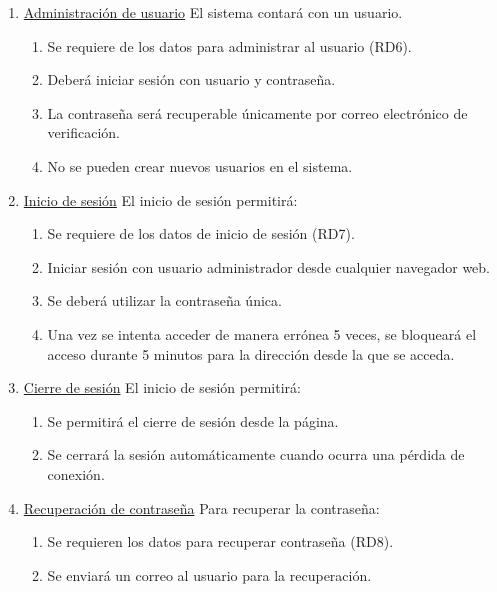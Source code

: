 \documentclass[10pt,a4paper]{article}
\begin{document}
\begin{enumerate}[label=RF\arabic*. ,leftmargin=2.8\parindent]
	\bigskip
	\item \underline{Administración de usuario}
	\newline \newline
	El sistema contará con un usuario.
	\begin{enumerate}[label=-]
	\item Se requiere de los datos para administrar al usuario (RD6).
		\item Deberá iniciar sesión con usuario y contraseña.
		\item La contraseña será recuperable únicamente por correo electrónico de verificación.
		\item No se pueden crear nuevos usuarios en el sistema.
		
	\end{enumerate}

	\bigskip
	\item \underline{Inicio de sesión}
	\newline \newline
	El inicio de sesión permitirá:
	\begin{enumerate}[label=-]
	\item Se requiere de los datos de inicio de sesión (RD7).
		\item Iniciar sesión con usuario administrador desde cualquier navegador web.
		\item Se deberá utilizar la contraseña única.
		\item Una vez se intenta acceder de manera errónea 5 veces, se bloqueará el acceso durante 5 minutos para la dirección desde la que se acceda.
	\end{enumerate}


	\bigskip
	\item \underline{Cierre de sesión}
	\newline \newline
	El inicio de sesión permitirá:
	\begin{enumerate}[label=-]
		\item Se permitirá el cierre de sesión desde la página.
		\item Se cerrará la sesión automáticamente cuando ocurra una pérdida de conexión.
	\end{enumerate}

	\bigskip
	\item \underline{Recuperación de contraseña}
	\newline \newline
	Para recuperar la contraseña:
	\begin{enumerate}[label=-]
		\item Se requieren los datos para recuperar contraseña (RD8).
		\item Se enviará un correo al usuario para la recuperación.
	\end{enumerate}
	

\end{enumerate}
\end{document}
